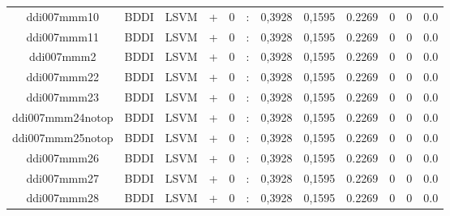 \documentclass[a4paper]{article}
\begin{document}
\begin{landscape}
\begin{center}
\begin{tabular}{ |c|c|c|c|c|c|c|c|c|c|c|c|}
 	
 
 	
 		
 		\small{ ddi007mmm10 } & BDDI & LSVM & +  &  0 &  :  &  0,3928 & 0,1595 & 0.2269  &  0 & 0 & 0.0 \\
 		

 	
 
 	
 		
 		\small{ ddi007mmm11 } & BDDI & LSVM & +  &  0 &  :  &  0,3928 & 0,1595 & 0.2269  &  0 & 0 & 0.0 \\
 		

 	
 
 	
 		
 		\small{ ddi007mmm2 } & BDDI & LSVM & +  &  0 &  :  &  0,3928 & 0,1595 & 0.2269  &  0 & 0 & 0.0 \\
 		

 	
 
 	
 		
 		\small{ ddi007mmm22 } & BDDI & LSVM & +  &  0 &  :  &  0,3928 & 0,1595 & 0.2269  &  0 & 0 & 0.0 \\
 		

 	
 
 	
 		
 		\small{ ddi007mmm23 } & BDDI & LSVM & +  &  0 &  :  &  0,3928 & 0,1595 & 0.2269  &  0 & 0 & 0.0 \\
 		

 	
 
 	
 		
 		\small{ ddi007mmm24notop } & BDDI & LSVM & +  &  0 &  :  &  0,3928 & 0,1595 & 0.2269  &  0 & 0 & 0.0 \\
 		

 	
 
 	
 		
 		\small{ ddi007mmm25notop } & BDDI & LSVM & +  &  0 &  :  &  0,3928 & 0,1595 & 0.2269  &  0 & 0 & 0.0 \\
 		

 	
 
 	
 		
 		\small{ ddi007mmm26 } & BDDI & LSVM & +  &  0 &  :  &  0,3928 & 0,1595 & 0.2269  &  0 & 0 & 0.0 \\
 		

 	
 
 	
 		
 		\small{ ddi007mmm27 } & BDDI & LSVM & +  &  0 &  :  &  0,3928 & 0,1595 & 0.2269  &  0 & 0 & 0.0 \\
 		

 	
 
 	
 		
 		\small{ ddi007mmm28 } & BDDI & LSVM & +  &  0 &  :  &  0,3928 & 0,1595 & 0.2269  &  0 & 0 & 0.0 \\
 		


\end{tabular}
\end{center}
\end{landscape}
\end{document}
